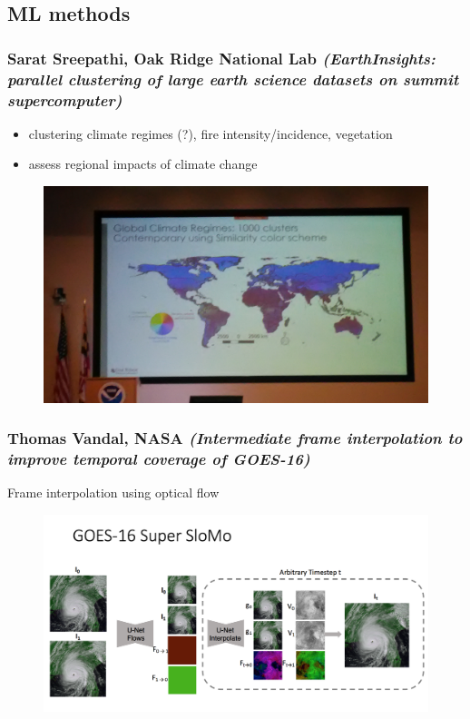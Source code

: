 \documentclass{beamer}
\begin{document}
\subsection{ML methods}
\begin{frame}
\frametitle{Sarat Sreepathi, Oak Ridge National Lab
 \textit{(EarthInsights: parallel clustering of large earth science datasets on summit supercomputer)}}
 \begin{itemize}
\item clustering climate regimes (?), fire intensity/incidence, vegetation
\item assess regional impacts of climate change
\end{itemize}
\begin{figure}
	\includegraphics[width=.8\linewidth]{figs/P_20190424_104512.jpg}
\end{figure}
\end{frame}

\begin{frame}
\frametitle{Thomas Vandal, NASA \textit{(Intermediate frame interpolation to improve temporal coverage of GOES-16)}}
Frame interpolation using optical flow
\begin{figure}
	\includegraphics[width=.9\linewidth]{figs/ScreenShot_SloMo.png}
\end{figure}
\end{frame}
\end{document}
